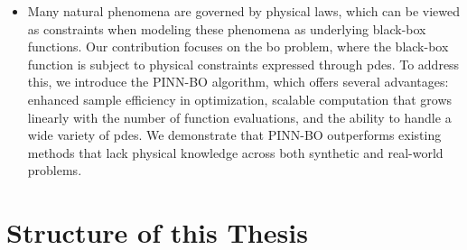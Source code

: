 \begin{itemize}
    \item Many natural phenomena are governed by physical laws, which can be viewed as constraints when modeling these phenomena as underlying black-box functions. Our contribution focuses on the \ac{bo} problem, where the black-box function is subject to physical constraints expressed through \acp{pde}. To address this, we introduce the PINN-BO algorithm, which offers several advantages: enhanced sample efficiency in optimization, scalable computation that grows linearly with the number of function evaluations, and the ability to handle a wide variety of \acp{pde}. We demonstrate that PINN-BO outperforms existing methods that lack physical knowledge across both synthetic and real-world problems. 
\end{itemize}

\section{Structure of this Thesis}
